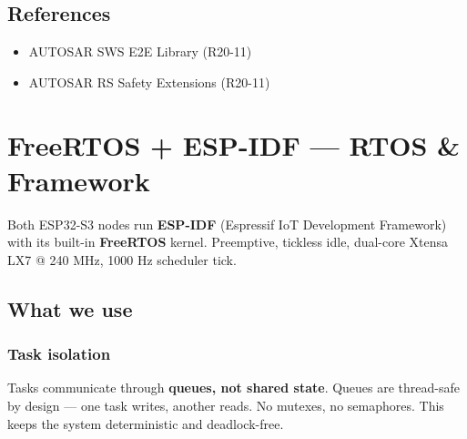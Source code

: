 \documentclass[12pt,a4paper,oneside]{report}
\providecommand{\tightlist}{\setlength{\itemsep}{0pt}\setlength{\parskip}{0pt}}
\begin{document}
\section{References}\label{references}

\begin{itemize}
\tightlist
\item
  AUTOSAR SWS E2E Library (R20-11)
\item
  AUTOSAR RS Safety Extensions (R20-11)
\end{itemize}


\chapter{FreeRTOS + ESP-IDF --- RTOS \&
Framework}\label{freertos-esp-idf-rtos-framework}

Both ESP32-S3 nodes run \textbf{ESP-IDF} (Espressif IoT Development Framework)
with its built-in \textbf{FreeRTOS} kernel. Preemptive, tickless idle, dual-core
Xtensa LX7 @ 240 MHz, 1000 Hz scheduler tick.

\section{What we use}\label{what-we-use}

\subsection{Task isolation}\label{task-isolation}

Tasks communicate through \textbf{queues, not shared state}. Queues are
thread-safe by design --- one task writes, another reads. No mutexes, no
semaphores. This keeps the system deterministic and deadlock-free.
\end{document}
